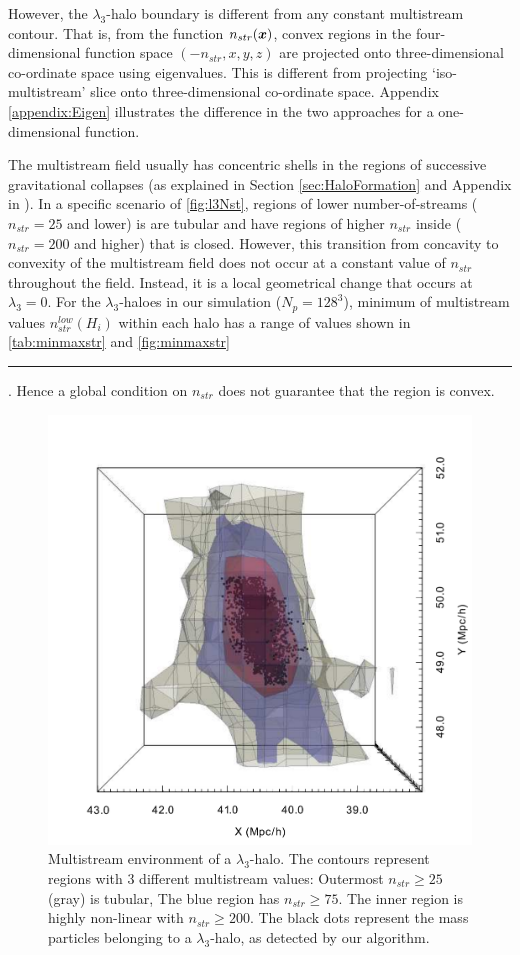 \documentclass[fleqn,usenatbib,useAMS]{mnras}
\newcommand\hl{\bgroup\markoverwith
  {\textcolor{yellow}{\rule[-.5ex]{2pt}{2.5ex}}}\ULon}
\begin{document}
However, the $\lambda_3$-halo boundary is different from any constant multistream contour. That is, from the function $n_{str}(\bmath{x})$, convex regions in the four-dimensional function space $(-n_{str}, x, y, z)$ are projected onto three-dimensional co-ordinate space using eigenvalues. This is different from projecting `iso-multistream' slice onto three-dimensional co-ordinate space. Appendix \ref{appendix:Eigen} illustrates the difference in the two approaches for a one-dimensional function. 


The multistream field usually has concentric shells in the regions of successive gravitational collapses (as explained in Section \ref{sec:HaloFormation} and Appendix in \citealt{Ramachandra2017}). In a specific scenario  of \autoref{fig:l3Nst}, regions of lower number-of-streams ($n_{str} = 25$ and lower) is are tubular and have regions of higher $n_{str}$ inside ($n_{str} = 200$ and higher) that is closed. However, this transition from concavity to convexity of the multistream field does not occur at a constant value of $n_{str}$ throughout the field. Instead, it is a local geometrical change that occurs at $\lambda_3 = 0$. For the $\lambda_3$-haloes in our simulation ($N_p = 128^3$), minimum of multistream values $n_{str}^{low}(H_i)$ within each halo has a range of values shown in \autoref{tab:minmaxstr} and \autoref{fig:minmaxstr} \hl{-- this varies between $ 3 \leq n_{str}^{low}(H_i) \leq 459$}. Hence a global condition on $n_{str}$ does not guarantee that the region is convex. 



\begin{figure}
\begin{minipage}[t]{.99\linewidth}
  \centering\includegraphics[width=7.cm]{fig9.pdf} 
\end{minipage}\hfill
\caption{Multistream environment of a $\lambda_3$-halo. The contours represent regions with 3 different multistream values: Outermost $n_{str} \geq 25$ (gray) is tubular, The blue region has $n_{str} \geq 75$. The inner region is highly non-linear with $n_{str} \geq 200$.  The black dots represent the mass particles belonging to a $\lambda_3$-halo, as detected by our algorithm.}
\label{fig:l3Nst}
\end{figure}
\end{document}

